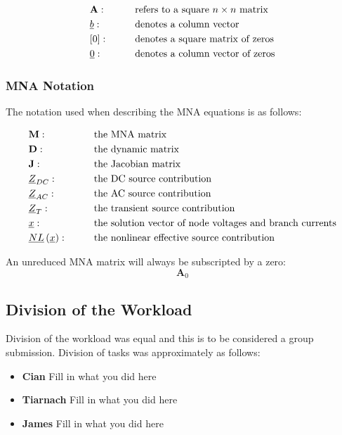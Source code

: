 \begin{align*}
    & \mathbf{A}: \qquad &&\text{refers to a square $n \times n$ matrix} \\
    & \underline{b}: \qquad &&\text{denotes a column vector}\\
    & [0]: \qquad &&\text{denotes a square matrix of zeros}\\
    & \underline{0}: \qquad&& \text{denotes a column vector of zeros}
\end{align*}

\subsubsection*{MNA Notation}
The notation used when describing the MNA equations is as follows:

\begin{align*}
    & \mathbf{M}: \qquad& &\text{the MNA matrix}\\
    & \mathbf{D}: \qquad &&\text{the dynamic matrix}\\
    & \mathbf{J}: \qquad& &\text{the Jacobian matrix}\\
    & \underline{Z}_{DC}: \qquad& &\text{the DC source contribution}\\
    & \underline{Z}_{AC}: \qquad& &\text{the AC source contribution}\\
    & \underline{Z}_{T}: \qquad &&\text{the transient source contribution}\\
    & \underline{x}: \qquad &&\text{the solution vector of node voltages and branch currents}\\
    & \underline{NL}\left( \underline{x}\right): \qquad &&\text{the nonlinear effective source contribution}
\end{align*}

An unreduced MNA matrix will always be subscripted by a zero: \[ \mathbf{A}_0\]

\subsection{Division of the Workload}
Division of the workload was equal and this is to be considered a group submission. Division of tasks was approximately as follows:
\begin{itemize}
    \item \textbf{Cian} Fill in what you did here
    \item \textbf{Tiarnach} Fill in what you did here
    \item \textbf{James} Fill in what you did here
\end{itemize}